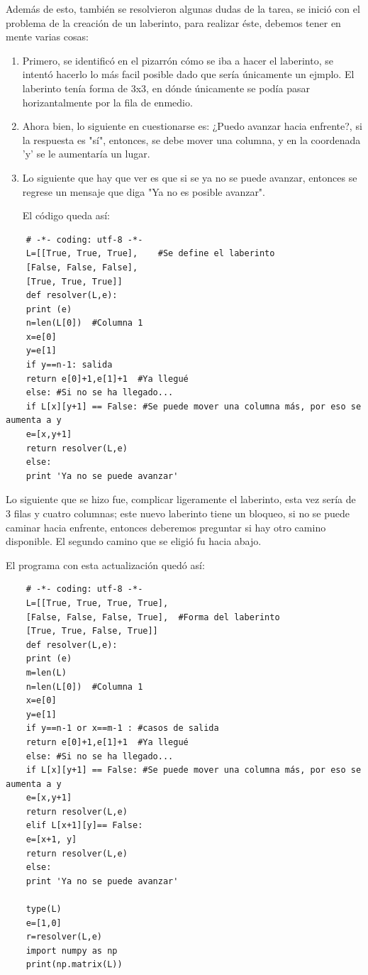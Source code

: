\documentclass{book}
\begin{document}
	Además de esto, también se resolvieron algunas dudas de la tarea, se inició con el problema de la creación de un laberinto, para realizar éste, debemos tener en mente varias cosas:
	\begin{enumerate}
		\item 
		Primero, se identificó en el pizarrón cómo se iba a hacer el laberinto, se intentó hacerlo lo más facil posible dado que sería únicamente un ejmplo. El laberinto tenía forma de 3x3, en dónde únicamente se podía pasar horizantalmente por la fila de enmedio.
		\item 
		Ahora bien, lo siguiente en cuestionarse es: ¿Puedo avanzar hacia enfrente?, si la respuesta es "sí", entonces, se debe mover una columna, y en la coordenada 'y' se le aumentaría un lugar.
		\item 
		Lo siguiente que hay que ver es que si se ya no se puede avanzar, entonces se regrese un mensaje que diga "Ya no es posible avanzar".
		
		El código queda así:
	\end{enumerate}
	\begin{verbatim}
	# -*- coding: utf-8 -*-
	L=[[True, True, True],    #Se define el laberinto
	[False, False, False],
	[True, True, True]]
	def resolver(L,e):
	print (e)
	n=len(L[0])  #Columna 1
	x=e[0]
	y=e[1]
	if y==n-1: salida
	return e[0]+1,e[1]+1  #Ya llegué
	else: #Si no se ha llegado...
	if L[x][y+1] == False: #Se puede mover una columna más, por eso se aumenta a y 
	e=[x,y+1]
	return resolver(L,e)
	else:
	print 'Ya no se puede avanzar'
	\end{verbatim}
	
	Lo siguiente que se hizo fue, complicar ligeramente el laberinto, esta vez sería de 3 filas y cuatro columnas; este nuevo laberinto tiene un bloqueo, si no se puede caminar hacia enfrente, entonces deberemos preguntar si hay otro camino disponible. El segundo camino que se eligió fu hacia abajo.
	
	El programa con esta actualización quedó así:
	\begin{verbatim}
	# -*- coding: utf-8 -*-
	L=[[True, True, True, True],
	[False, False, False, True],  #Forma del laberinto
	[True, True, False, True]]
	def resolver(L,e):
	print (e)
	m=len(L)
	n=len(L[0])  #Columna 1
	x=e[0]
	y=e[1]
	if y==n-1 or x==m-1 : #casos de salida
	return e[0]+1,e[1]+1  #Ya llegué
	else: #Si no se ha llegado...
	if L[x][y+1] == False: #Se puede mover una columna más, por eso se aumenta a y 
	e=[x,y+1]
	return resolver(L,e)
	elif L[x+1][y]== False:
	e=[x+1, y]
	return resolver(L,e)
	else:
	print 'Ya no se puede avanzar'
	
	type(L)
	e=[1,0]
	r=resolver(L,e)
	import numpy as np
	print(np.matrix(L))
	\end{verbatim}
	
\end{document}
